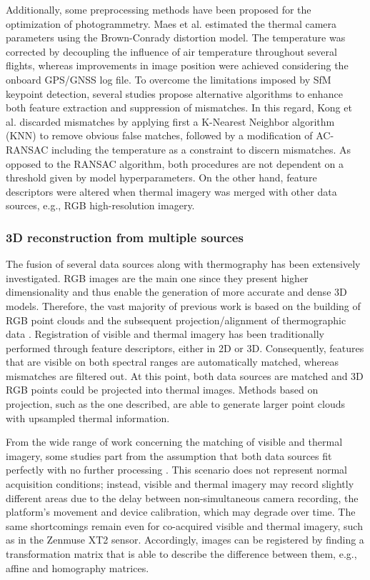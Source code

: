 Additionally, some preprocessing methods have been proposed for the optimization of photogrammetry. Maes et al. \cite{maes_optimizing_2017} estimated the thermal camera parameters using the Brown-Conrady distortion model. The temperature was corrected by decoupling the influence of air temperature throughout several flights, whereas improvements in image position were achieved considering the onboard GPS/GNSS log file. To overcome the limitations imposed by SfM keypoint detection, several studies propose alternative algorithms to enhance both feature extraction and suppression of mismatches. In this regard, Kong et al. \cite{kong_3-d_2018} discarded mismatches by applying first a K-Nearest Neighbor algorithm (KNN) to remove obvious false matches, followed by a modification of AC-RANSAC including the temperature as a constraint to discern mismatches. As opposed to the RANSAC algorithm, both procedures are not dependent on a threshold given by model hyperparameters. On the other hand, feature descriptors were altered when thermal imagery was merged with other data sources, e.g., RGB high-resolution imagery.

\subsubsection{3D reconstruction from multiple sources}

The fusion of several data sources along with thermography has been extensively investigated. RGB images are the main one since they present higher dimensionality and thus enable the generation of more accurate and dense 3D models. Therefore, the vast majority of previous work is based on the building of RGB point clouds and the subsequent projection/alignment of thermographic data \cite{hosoi_estimating_2019}. Registration of visible and thermal imagery has been traditionally performed through feature descriptors, either in 2D or 3D. Consequently, features that are visible on both spectral ranges are automatically matched, whereas mismatches are filtered out. At this point, both data sources are matched and 3D RGB points could be projected into thermal images. Methods based on projection, such as the one described, are able to generate larger point clouds with upsampled thermal information. 

From the wide range of work concerning the matching of visible and thermal imagery, some studies part from the assumption that both data sources fit perfectly with no further processing \cite{hou_fusing_2021, stojcsics_high_2018}. This scenario does not represent normal acquisition conditions; instead, visible and thermal imagery may record slightly different areas due to the delay between non-simultaneous camera recording, the platform's movement and device calibration, which may degrade over time. The same shortcomings remain even for co-acquired visible and thermal imagery, such as in the Zenmuse XT2 sensor. Accordingly, images can be registered by finding a transformation matrix that is able to describe the difference between them, e.g., affine and homography matrices. 

